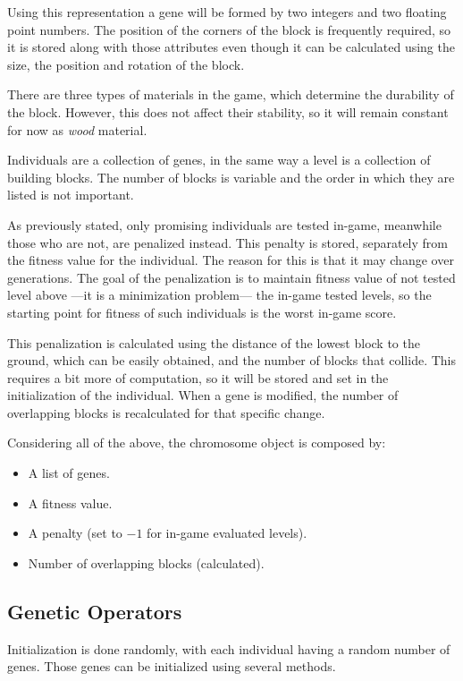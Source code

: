 Using this representation a gene will be formed by two integers and two floating point numbers.
The position of the corners of the block is frequently required, so it is stored along with those attributes even though it can be calculated using the size, the position and rotation of the block. 

There are three types of materials in the game, which determine the durability of the block. However, this does not affect their stability, so it will remain constant for now as \textit{wood} material.

Individuals are a collection of genes, in the same way a level is a collection of building blocks. The number of blocks is variable and the order in which they are listed is not important. 

As previously stated, only promising individuals are tested in-game, meanwhile those who are not, are penalized instead. This penalty is stored, separately from the fitness value for the individual. The reason for this is that it may change over generations. The goal of the penalization is to maintain fitness value of not tested level above ---it is a minimization problem--- the in-game tested levels, so the starting point for fitness of such individuals is the worst in-game score.

This penalization is calculated using the distance of the lowest block to the ground, which can be easily obtained, and the number of blocks that collide. This requires a bit more of computation, so it will be stored and set in the initialization of the individual. When a gene is modified, the number of overlapping blocks is recalculated for that specific change.

Considering all of the above, the chromosome object is composed by:
\begin{itemize}
	\item A list of genes.
	\item A fitness value.
	\item A penalty (set to $-1$ for in-game evaluated levels).
	\item Number of overlapping blocks (calculated).
\end{itemize}

\subsection{Genetic Operators}

Initialization is done randomly, with each individual having a random number of genes. Those genes can be initialized using several methods. 

